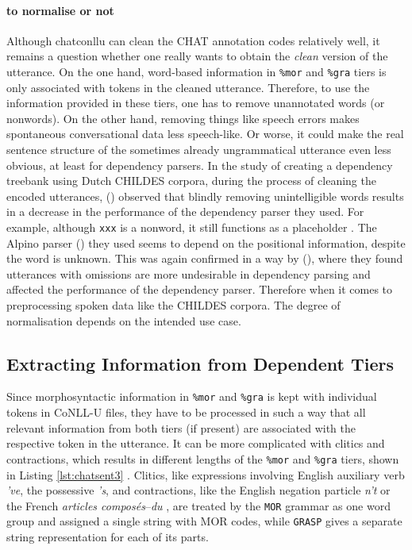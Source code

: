 \paragraph{to normalise or not} Although chatconllu can clean the CHAT annotation codes relatively well, it remains a question whether one really wants to obtain the \emph{clean} version of the utterance. On the one hand, word-based information in \texttt{\%mor} and \texttt{\%gra} tiers is only associated with tokens in the cleaned utterance. Therefore, to use the information provided in these tiers, one has to remove unannotated words (or nonwords). On the other hand, removing things like speech errors makes spontaneous conversational data less speech-like. Or worse, it could make the real sentence structure of the sometimes already ungrammatical utterance even less obvious, at least for dependency parsers. In the study of creating a dependency treebank using Dutch CHILDES corpora, during the process of cleaning the encoded utterances, (\cite{odijk2018anncor}) observed that blindly removing unintelligible words results in a decrease in the performance of the dependency parser they used. For example, although \texttt{xxx} is a nonword, it still functions as a placeholder . The Alpino parser (\cite{bouma}) they used seems to depend on the positional information, despite the word is unknown. This was again confirmed in a way by (\cite{liu2021}), where they found utterances with omissions are more undesirable in dependency parsing and affected the performance of the dependency parser. Therefore when it comes to preprocessing spoken data like the CHILDES corpora. The degree of normalisation depends on the intended use case.

\subsection{Extracting Information from Dependent Tiers}

Since morphosyntactic information in \texttt{\%mor} and \texttt{\%gra} is kept with individual tokens in CoNLL-U files, they have to be processed in such a way that all relevant information from both tiers (if present) are associated with the respective token in the utterance. It can be more complicated with clitics and contractions, which results in different lengths of the \texttt{\%mor} and \texttt{\%gra} tiers, shown in Listing \ref{lst:chatsent3} . Clitics, like expressions involving English auxiliary verb \emph{'ve}, the possessive \emph{'s}, and contractions, like the English negation particle \emph{n't} or the French \emph{articles composés}--\emph{du} , are treated by the \texttt{MOR} grammar as one word group and assigned a single string with MOR codes, while \texttt{GRASP} gives a separate string representation for each of its parts.\\

